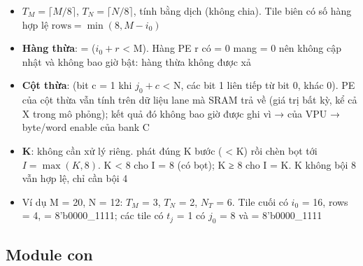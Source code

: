 \documentclass[10pt,a4paper]{article}
\begin{document}
\begin{itemize}
\item $T_M = \lceil M/8\rceil$, $T_N = \lceil N/8\rceil$, tính bằng dịch (không chia). Tile biên có số hàng hợp lệ $\text{rows} = \min(8, M - i_0)$
\item \textbf{Hàng thừa}:  = ($i_0 + r$ < M). Hàng PE r có  = 0 mang  = 0 nên  không cập nhật và  không bao giờ bật: hàng thừa không được xả
\item \textbf{Cột thừa}:  (bit c = 1 khi $j_0 + c$ < N, các bit 1 liên tiếp từ bit 0, khác 0). PE của cột thừa vẫn tính trên dữ liệu lane mà SRAM trả về (giá trị bất kỳ, kể cả X trong mô phỏng); kết quả đó không bao giờ được ghi vì  →  của VPU → byte/word enable của bank C
\item \textbf{K}: không cần xử lý riêng.  phát đúng K bước ( < K) rồi chèn bọt tới $I = \max(K, 8)$. K < 8 cho I = 8 (có bọt); K ≥ 8 cho I = K. K không bội 8 vẫn hợp lệ, chỉ cần bội 4
\item Ví dụ M = 20, N = 12: $T_M$ = 3, $T_N$ = 2, $N_T$ = 6. Tile cuối có $i_0$ = 16, rows = 4,  = 8'b0000\_1111; các tile có $t_j$ = 1 có $j_0$ = 8 và  = 8'b0000\_1111
\end{itemize}

\subsection{Module con}\label{sec:5}

\subsubsection{\texorpdfstring{}{gemm\_pe}}\label{sec:5.1}
\end{document}
